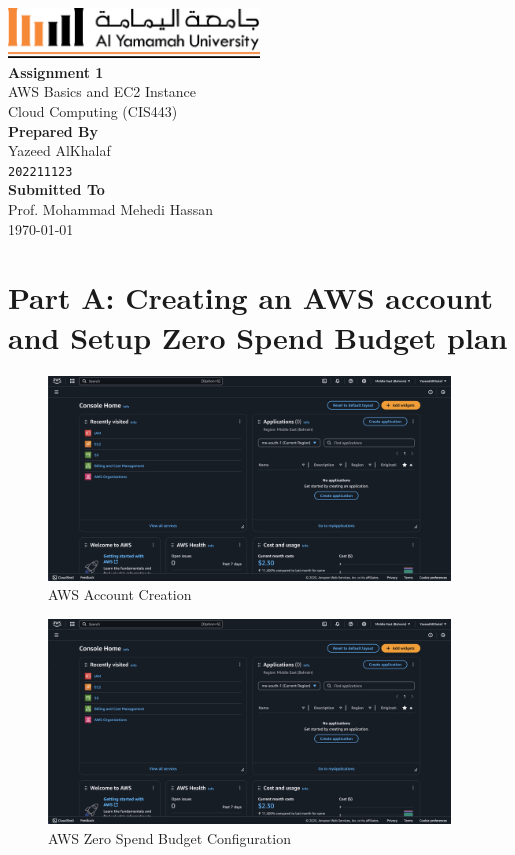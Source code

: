\documentclass[a4paper,12pt]{article}
\def\maketitle{
  \begin{titlepage}
    \centering
    \vspace*{-1cm}
    \includegraphics[width=0.5\textwidth]{yu-logo.png}\\[2cm]
    
    {\huge\bfseries Assignment 1\\}
    \vspace{0.5cm}
    {\Large AWS Basics and EC2 Instance}\\[1.5cm]
    
    {\large Cloud Computing (CIS443)}\\[3cm]
    
    {\large\bfseries Prepared By}\\[0.3cm]
    {\Large Yazeed AlKhalaf}\\
    {\texttt{202211123}}\\[2cm]
    
    {\large\bfseries Submitted To}\\[0.3cm]
    {\Large Prof. Mohammad Mehedi Hassan}\\[2cm]
    
    {\large \today}
    
    \vfill
  \end{titlepage}
}
\begin{document}
\maketitle

\thispagestyle{fancy}
\tableofcontents
\newpage

\thispagestyle{fancy}
\listoffigures
\newpage

\setcounter{page}{1}

\section{Part A: Creating an AWS account and Setup Zero Spend Budget plan}

\begin{figure}[H]
    \centering
    \includegraphics[width=0.95\textwidth]{aws-account.png}
    \caption{AWS Account Creation}
    \label{fig:aws-account}
\end{figure}

\begin{figure}[H]
    \centering
    \includegraphics[width=0.95\textwidth]{aws-account.png}
    \caption{AWS Zero Spend Budget Configuration}
    \label{fig:aws-zero-spend-budget-config}
\end{figure}
\end{document}

